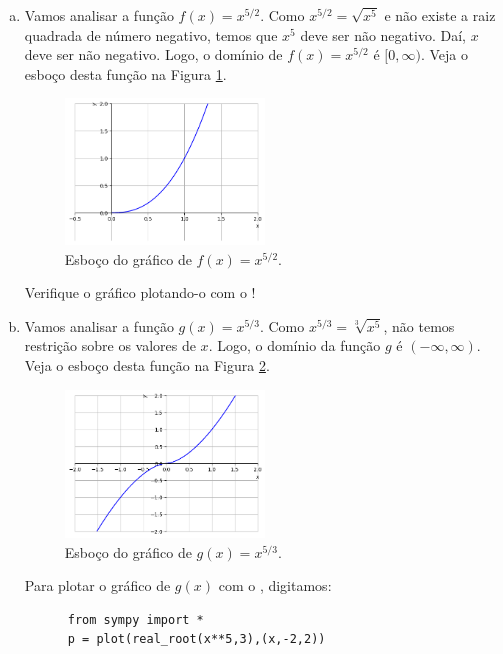 \begin{resol}
  \begin{enumerate}[a)]
  \item Vamos analisar a função $f(x) = x^{5/2}$. Como $x^{5/2} = \sqrt{x^5}$ e não existe a raiz quadrada de número negativo, temos que $x^5$ deve ser não negativo. Daí, $x$ deve ser não negativo. Logo, o domínio de $f(x) = x^{5/2}$ é $[0, \infty)$. Veja o esboço desta função na Figura \ref{fig:exeresol_funpot_graf_a}.

    \begin{figure}[H]
      \centering
      \includegraphics[width=0.5\textwidth]{./cap_funcao/dados/fig_exeresol_funpot_graf/fig_exeresol_funpot_graf_a}
      \caption{Esboço do gráfico de $f(x) = x^{5/2}$.}
      \label{fig:exeresol_funpot_graf_a}
    \end{figure}

    \ifispython
    Verifique o gráfico plotando-o com o {\sympy}!
    \fi
  \item Vamos analisar a função $g(x) = x^{5/3}$. Como $x^{5/3} = \sqrt[3]{x^5}$, não temos restrição sobre os valores de $x$. Logo, o domínio da função $g$ é $(-\infty, \infty)$. Veja o esboço desta função na Figura \ref{fig:exeresol_funpot_graf_b}.
    
    \begin{figure}[H]
      \centering
      \includegraphics[width=0.5\textwidth]{./cap_funcao/dados/fig_exeresol_funpot_graf/fig_exeresol_funpot_graf_b}
      \caption{Esboço do gráfico de $g(x) = x^{5/3}$.}
      \label{fig:exeresol_funpot_graf_b}
    \end{figure}

    \ifispython
    Para plotar o gráfico de $g(x)$ com o {\sympy}, digitamos:
    \begin{lstlisting}
      from sympy import *
      p = plot(real_root(x**5,3),(x,-2,2))
    \end{lstlisting}
    \fi
  \end{enumerate}
\end{resol}

